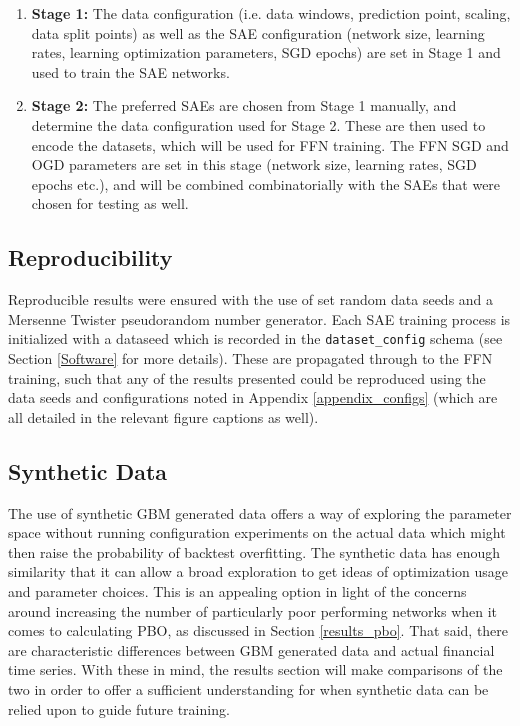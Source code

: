 \documentclass[a4paper,11pt,oneside]{article}
\theoremstyle{plain}
\theoremstyle{definition}
\begin{document}
	\begin{enumerate}
		\item \textbf{Stage 1:} The data configuration (i.e. data windows, prediction point, scaling, data split points) as well as the SAE configuration (network size, learning rates, learning optimization parameters, SGD epochs) are set in Stage 1 and used to train the SAE networks.
		\item \textbf{Stage 2:} The preferred SAEs are chosen from Stage 1 manually, and determine the data configuration used for Stage 2. These are then used to encode the datasets, which will be used for FFN training. The FFN SGD and OGD parameters are set in this stage (network size, learning rates, SGD epochs etc.), and will be combined combinatorially with the SAEs that were chosen for testing as well.
	\end{enumerate}
	
	\subsection{Reproducibility}\label{proc_reproducibility}
	
	Reproducible results were ensured with the use of set random data seeds and a Mersenne Twister pseudorandom number generator. Each SAE training process is initialized with a dataseed which is recorded in the \texttt{dataset\_config} schema (see Section \ref{Software} for more details). These are propagated through to the FFN training, such that any of the results presented could be reproduced using the data seeds and configurations noted in Appendix \ref{appendix_configs} (which are all detailed in the relevant figure captions as well).
	
	\subsection{Synthetic Data}\label{proc_synthetic}
	
	The use of synthetic GBM generated data offers a way of exploring the parameter space without running configuration experiments on the actual data which might then raise the probability of backtest overfitting. The synthetic data has enough similarity that it can allow a broad exploration to get ideas of optimization usage and parameter choices. This is an appealing option in light of the concerns around increasing the number of particularly poor performing networks when it comes to calculating PBO, as discussed in Section \ref{results_pbo}. That said, there are characteristic differences between GBM generated data and actual financial time series. With these in mind, the results section will make comparisons of the two in order to offer a sufficient understanding for when synthetic data can be relied upon to guide future training.\newline
	
\end{document}
